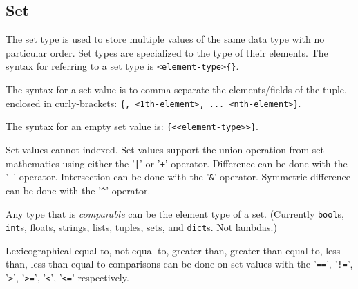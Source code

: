 
\subsection{Set}
{
	The set type is used to store
	multiple values of the same data type with no
	particular order.
	Set types are specialized to the type of their elements.
	The syntax for referring to a set type
	is \texttt{<element-type>\{\}}.
	
	The syntax for a set value is to comma separate the elements/fields
	of the tuple, enclosed in
	curly-brackets: \texttt{\{<0th-element>, <1th-element>, ... <nth-element>\}}.
	
	The syntax for an empty set value is: \texttt{\{<<element-type>>\}}.
	
	Set values cannot indexed.
	Set values support the union operation from set-mathematics using
	either the '\texttt{|}' or '\texttt{+}' operator.
	Difference can be done with the '\texttt{-}' operator.
	Intersection can be done with the '\texttt{\&}' operator.
	Symmetric difference can be done with the '\texttt{\^}' operator.
	
	Any type that is \textit{comparable} can be the element type of a set.
	(Currently \texttt{bool}s, \texttt{int}s, floats, strings, lists, tuples,
		sets, and \texttt{dict}s. Not lambdas.)
	
	Lexicographical equal-to, not-equal-to, greater-than, greater-than-equal-to,
	less-than, less-than-equal-to comparisons can be done on set values with
	the '\texttt{==}', '\texttt{!=}',
	'\texttt{>}', '\texttt{>=}', '\texttt{<}', '\texttt{<=}' respectively.
	
}
